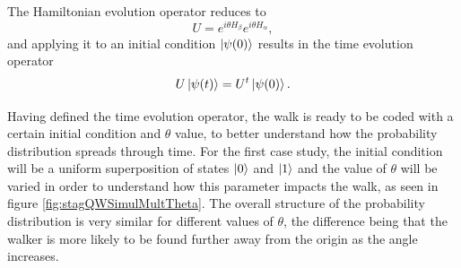 \documentclass[../../dissertation.tex]{subfiles}
\begin{document}
The Hamiltonian evolution operator reduces to
\begin{equation}
	U = e^{i\theta H_\beta}e^{i\theta H_\alpha},
	\label{eq:stagSimulUniOp}
\end{equation}
and applying it to an initial condition $\ket{\psi(0)}$ results in the time
evolution operator
\begin{equation}
	U\ket{\psi(t)} = U^t\ket{\psi(0)}.
\end{equation}\par

Having defined the time evolution operator, the walk is ready to be coded with
a certain initial condition and $\theta$ value, to better understand how the
probability distribution spreads through time. 
For the first case study, the initial condition will be a uniform superposition
of states $\ket{0}$ and $\ket{1}$ and the value of $\theta$ will be varied in
order to understand how this parameter impacts the walk, as seen in
figure \ref{fig:stagQWSimulMultTheta}. The overall structure of the probability
distribution is very similar for different values of $\theta$, the difference
being that the walker is more likely to be found further away from the origin
as the angle increases.
\end{document}
